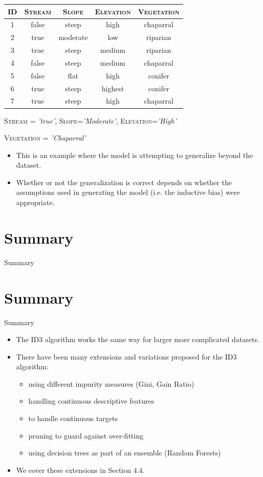 \documentclass[xcolor={table}]{beamer}
\newcommand{\SectionSlide}[2][]{
	\ifthenelse{\isempty{#1}}
		{\section{#2}\begin{frame} \begin{center}\begin{huge}#2\end{huge}\end{center}\end{frame}}
		{\section[#1]{#2}\begin{frame} \begin{center}\begin{huge}#2\end{huge}\end{center}\end{frame}}
}
\newcommand{\featN}[1]{\textsc{#1}}
\newcommand{\featL}[1]{\textit{'#1'}}
\begin{document}
\begin{frame}
\begin{table}[h]
\centering
\begin{footnotesize}
\begin{tabular}{c c c c c }
\hline
\featN{ID}	 & \featN{Stream}	& \featN{Slope} & \featN{Elevation} & \featN{Vegetation}\\
\hline
1 & false & steep & high & chaparral\\
2 & true & moderate & low & riparian\\
3 & true & steep & medium & riparian\\
4 & false & steep & medium & chaparral\\
5 & false & flat & high & conifer\\
6 & true & steep & highest & conifer\\
7 & true & steep & high & chaparral\\
\hline
\end{tabular}
\end{footnotesize}
\end{table}
\begin{center}
\featN{Stream} = \featL{true}, \featN{Slope}=\featL{Moderate}, \featN{Elevation}=\featL{High}
\end{center}
\begin{center}
\alert{\featN{Vegetation} = \featL{Chaparral}}
\end{center}
	\begin{itemize}
		\item This is an example where the model is attempting to \alert{generalize} beyond the dataset.
		\item Whether or not the generalization is correct depends on whether the assumptions used in generating the model (i.e. the \alert{inductive bias}) were appropriate.
	\end{itemize}
\end{frame}


\SectionSlide{Summary}


\begin{frame}
	\begin{itemize}
		\item The ID3 algorithm works the same way for larger more complicated datasets.
		\item There have been many extensions and variations proposed for the ID3 algorithm:
			\begin{itemize}
				\item using different impurity measures (Gini, Gain Ratio)
				\item handling continuous descriptive features
				\item to handle continuous targets
				\item pruning to guard against over-fitting
				\item using decision trees as part of an ensemble (Random Forests)
			\end{itemize}
		\item We cover these extensions in Section $4.4$.
	\end{itemize}
\end{frame}

\begin{frame}
	\tableofcontents
\end{frame}
\end{document}
